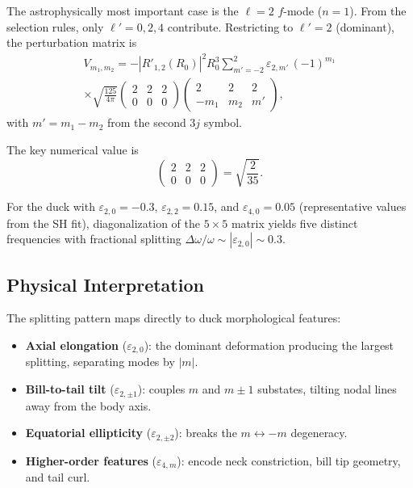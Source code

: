 \documentclass[aps,prd,twocolumn,superscriptaddress,nofootinbib]{revtex4-2}
\begin{document}
The astrophysically most important case is the $\ell = 2$ $f$-mode ($n=1$).
From the selection rules, only $\ell' = 0, 2, 4$ contribute.
Restricting to $\ell' = 2$ (dominant), the perturbation matrix is
\begin{multline}
V_{m_1,m_2} = -\left| R'_{1,2}(R_0) \right|^2 R_0^3
\sum_{m'=-2}^{2} \varepsilon_{2,m'} \, (-1)^{m_1} \\
\times \sqrt{\frac{125}{4\pi}}
\begin{pmatrix} 2 & 2 & 2 \\ 0 & 0 & 0 \end{pmatrix}
\begin{pmatrix} 2 & 2 & 2 \\ -m_1 & m_2 & m' \end{pmatrix},
\label{eq:V_l2}
\end{multline}
with $m' = m_1 - m_2$ from the second $3j$ symbol.

The key numerical value is
\begin{equation}
\begin{pmatrix} 2 & 2 & 2 \\ 0 & 0 & 0 \end{pmatrix} = \sqrt{\frac{2}{35}}.
\label{eq:3j_222}
\end{equation}

For the duck with $\varepsilon_{2,0} = -0.3$, $\varepsilon_{2,2} = 0.15$,
and $\varepsilon_{4,0} = 0.05$ (representative values from the SH fit),
diagonalization of the $5 \times 5$ matrix yields five distinct frequencies
with fractional splitting $\Delta\omega/\omega \sim |\varepsilon_{2,0}|
\sim 0.3$.


\subsection{Physical Interpretation}
\label{sec:zeeman_interp}

The splitting pattern maps directly to duck morphological features:

\begin{itemize}
\item \textbf{Axial elongation} ($\varepsilon_{2,0}$): the dominant
  deformation producing the largest splitting, separating modes by $|m|$.
\item \textbf{Bill-to-tail tilt} ($\varepsilon_{2,\pm 1}$): couples $m$
  and $m \pm 1$ substates, tilting nodal lines away from the body axis.
\item \textbf{Equatorial ellipticity} ($\varepsilon_{2,\pm 2}$): breaks
  the $m \leftrightarrow -m$ degeneracy.
\item \textbf{Higher-order features} ($\varepsilon_{4,m}$): encode neck
  constriction, bill tip geometry, and tail curl.
\end{itemize}
\end{document}
